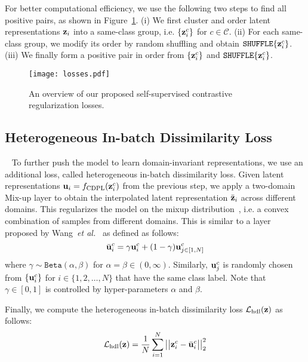 \documentclass[10pt,twocolumn,letterpaper]{article}
\renewcommand{\etal}{\textit{et al.}}
\begin{document}
For better computational efficiency, we use the following two steps to find all positive pairs, as shown in Figure~\ref{fig:losses}. (i) We first cluster and order latent representations ${\bf{z}}_{i}$ into a same-class group, i.e. $\{{\bf{z}}^{c}_{i}\}$ for $c\in\mathcal{C}$. (ii) For each same-class group, we modify its order by random shuffling and obtain $\texttt{SHUFFLE}\{{\bf{z}}^{c}_{i}\}$. (iii) We finally form a positive pair in order from $\{{\bf{z}}^{c}_{i}\}$ and $\texttt{SHUFFLE}\{{\bf{z}}^{c}_{i}\}$. 

\begin{figure}[t]
\begin{center}
   \texttt{[image: losses.pdf]}
\end{center}
   \caption{An overview of our proposed self-supervised contrastive regularization losses.}
\label{fig:losses}\end{figure}

\subsection{Heterogeneous In-batch Dissimilarity Loss}~\label{ss:hdl}
To further push the model to learn domain-invariant representations, we use an additional loss, called heterogeneous in-batch dissimilarity loss. Given latent representations ${\bf{u}}_{i}=f_{\textnormal{CDPL}}({\bf{z}}^{c}_{i})$ from the previous step, we apply a two-domain Mix-up layer to obtain the interpolated latent representation ${\bar{\bf{z}}}_{i}$ across different domains. This regularizes the model on the mixup distribution~\cite{zhang2017mixup}, i.e. a convex combination of samples from different domains. This is similar to a layer proposed by Wang~\etal~\cite{wang2020heterogeneous} as defined as follows:
\begin{equation}
    {\bar{\bf{u}}}^{c}_{i} = \gamma{\bf{u}}^{c}_{i} + (1-\gamma){\bf{u}}^{c}_{j\in[1,N]} 
\end{equation}
where $\gamma\sim\texttt{Beta}(\alpha, \beta)$ for $\alpha = \beta \in (0, \infty)$. Similarly, ${\bf{u}}^{c}_{j}$ is randomly chosen from $\{{\bf{u}}^{c}_{i}\}$ for $i\in\{1,2,\dots,N\}$ that have the same class label. Note that $\gamma\in[0,1]$ is controlled by hyper-parameters $\alpha$ and $\beta$.

Finally, we compute the heterogeneous in-batch dissimilarity loss $\mathcal{L}_\textnormal{hdl}({\bf z})$ as follows:
\begin{equation}\label{eq:L_hdl}
    \mathcal{L}_\textnormal{hdl}({\bf z}) = \frac{1}{N}\sum_{i=1}^{N}\big|\big|{\bf{z}}^{c}_{i}-{\bar{\bf{u}}}^{c}_{i}\big|\big|^{2}_{2}
\end{equation}
\end{document}
